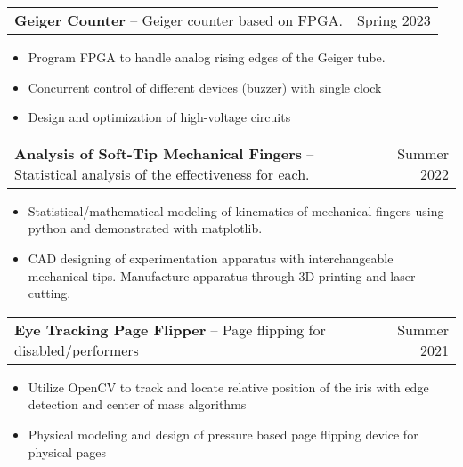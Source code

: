 \documentclass[oneside, 11pt]{article}
\newcommand*{\projectEntry}[3]{
	\noindent
	\begin{tabularx}{\textwidth}{Xr}
	\textbf{#1} -- #3 & #2
	\end{tabularx}
	\vspace{-1.25\baselineskip}
}
\newenvironment{expD}
	{\begin{itemize}[noitemsep,topsep=0pt]}
	{\end{itemize}}
\begin{document}
\projectEntry{Geiger Counter}
	{Spring 2023}
	{Geiger counter based on FPGA.}

\begin{expD}
	\item Program FPGA to handle analog rising edges of the Geiger tube.
	\item Concurrent control of different devices (buzzer) with single clock
	\item Design and optimization of high-voltage circuits
\end{expD}

\projectEntry{Analysis of Soft-Tip Mechanical Fingers}
	{Summer 2022}
	{Statistical analysis of the effectiveness for each.}

\begin{expD}
	\item Statistical/mathematical modeling of kinematics of mechanical fingers using python and demonstrated with matplotlib.
	\item CAD designing of experimentation apparatus with interchangeable mechanical tips. Manufacture apparatus through 3D printing and laser cutting.
\end{expD}

\projectEntry{Eye Tracking Page Flipper}
	{Summer 2021}
	{Page flipping for disabled/performers}

\begin{expD}
	\item Utilize OpenCV to track and locate relative position of the iris with edge detection and center of mass algorithms
	\item Physical modeling and design of pressure based page flipping device for physical pages
\end{expD}
\end{document}
